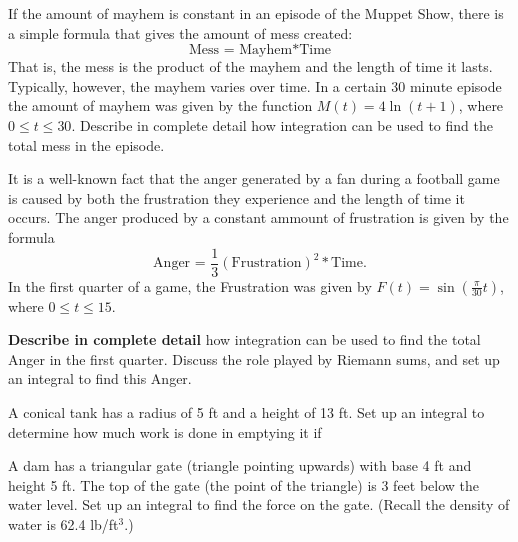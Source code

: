 \documentclass[12pt]{exam}
\begin{document}
\begin{questions}

\question If the amount of mayhem is constant in an episode of the Muppet Show, there is a simple
formula that gives the amount of mess created:
\[ \text{Mess = Mayhem} * \text{Time} \]
That is, the mess is the product of the mayhem and the length of time it lasts. Typically,
however, the mayhem varies over time. In a certain 30 minute episode the amount of
mayhem was given by the function $M(t) = 4 \ln(t + 1)$, where $0\leq t \leq 30$. Describe in
complete detail how integration can be used to find the total mess in the episode.
\vspace{.3in}

\question  It is a well-known fact that the anger generated by a fan
during a football game is caused by both the frustration they experience
and the length of time it occurs.  The anger produced by a 
 constant ammount of frustration is given by the formula
\[
\text{Anger = }\frac{1}{3} \left(\text {Frustration}\right)^2 * \text{Time}.
\]
In the first quarter of a game, the Frustration was given by
$\displaystyle F(t)= \sin\left(\frac{\pi}{30} t\right)  $, where $0\leq t\leq 15$.
\vspace{.2in}

\textbf{Describe in complete detail} how integration can be used to find
the total Anger in the first quarter.  Discuss the role played by Riemann 
sums, and set up an integral to find this Anger.
\vspace{.2in}

\question A conical tank  has a radius of 5 ft and a height of 13 ft.
Set up an integral to determine how much work is done in emptying it if

\question  A dam has a triangular gate (triangle pointing upwards) with base 4 ft
and height 5 ft.
The top of the gate (the point of the triangle) 
is 3 feet below the water level.  Set up an integral
to find the force on
the gate. (Recall the density of water is 62.4 lb/ft$^3$.)
\vspace{.3in}


\end{questions}
\end{document}
